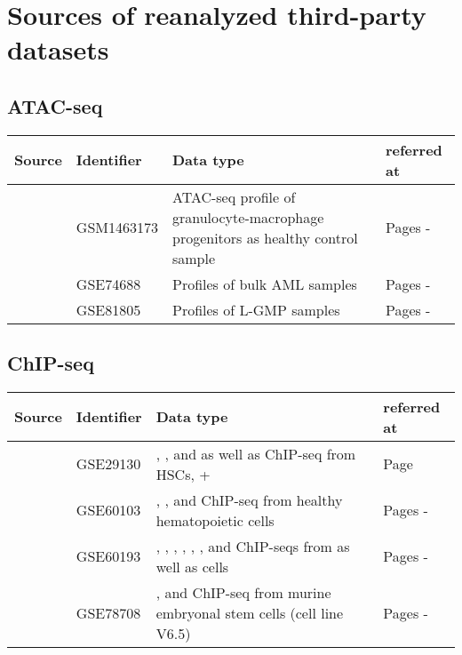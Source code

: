 \chapter{Sources of reanalyzed third-party datasets}
\label{chap:ap:thirdpartydata}

\section*{ATAC-seq}
	\label{chap:ap:thirdpartydata:atac}
	
\begin{tabular}{ll>{\raggedright}p{7.5cm}p{3.0cm}}
	\textbf{Source} & \textbf{Identifier} & \textbf{Data type} & \textbf{referred at} \\
	\hline
	\cite{Lara-Astiaso2014} & GSM1463173 & ATAC-seq profile of granulocyte-macrophage progenitors as healthy control sample & Pages \pageref{chap:r:enhancers:trowbridgestart}-\pageref{chap:r:enhancers:trowbridgeend} \\
	\cite{George2016} & GSE74688 & Profiles of \mllafnine bulk AML samples & Pages \pageref{chap:r:enhancers:trowbridgestart}-\pageref{chap:r:enhancers:trowbridgeend} \\
	\cite{George2016} & GSE81805 & Profiles of \mllafnine L-GMP samples & Pages \pageref{chap:r:enhancers:trowbridgestart}-\pageref{chap:r:enhancers:trowbridgeend} \\
\end{tabular}


\section*{ChIP-seq}
	\label{chap:ap:thirdpartydata:chip}

	\begin{tabular}{ll>{\raggedright}p{7.5cm}p{3.0cm}}
		\textbf{Source} & \textbf{Identifier} & \textbf{Data type} & \textbf{referred at} \\
		\hline
		\cite{Bernt2011} & GSE29130 & \hisfourthree, \histwentyseventhree, \histhirtysixthree and \hisseventyninetwo as well as \mllafnine ChIP-seq from HSCs, \mllafnine \kithi + \kitlow & Page \pageref{chap:r:enhancers:motifs:berntcite}\\
		 \cite{Lara-Astiaso2014} & GSE60103 & \hisfourone, \hisfourtwo, \hisfourthree and \histwentysevenac ChIP-seq from healthy hematopoietic cells & Pages \pageref{chap:r:enhancers:cluster}-\pageref{chap:r:enhancers:amitend} \\
		\cite{Wong2015} & GSE60193 & \hisfourtwo, \hisfourthree , \hiseighteenac, \histwentysevenac, \histwentyseventhree, \histhirtysixthree, \hisseventyninetwo and \poltwo ChIP-seqs from \mllafnine \kithi as well as \kitlow cells & Pages \pageref{chap:r:enhancers:cluster:clades:clearydata}-\pageref{chap:r:enhancers:clearyend} \\
		\cite{Hu2017} & GSE78708 &\proteinnamemouse{Mll2}, \proteinnamemouse{Menin} and \hisfourthree ChIP-seq from murine embryonal stem cells (cell line V6.5) & Pages \pageref{chap:r:enhancers:motifs:mlltwo}-\pageref{chap:r:enhancers:motifs:summary} \\
	\end{tabular}
		
